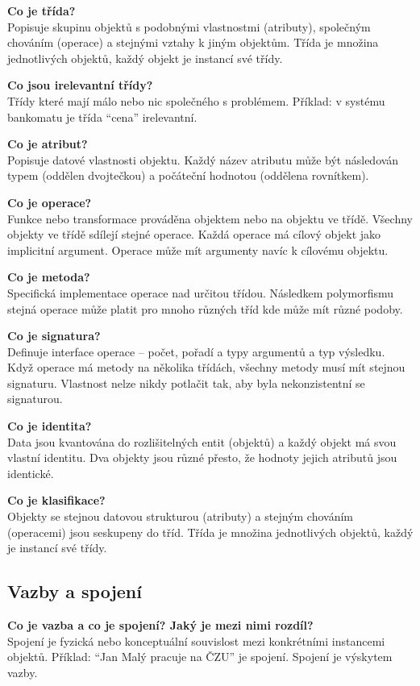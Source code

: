 \documentclass[12pt, a4paper]{article}
\begin{document}
\textbf{Co je třída?}\\
Popisuje skupinu objektů s podobnými vlastnostmi (atributy), společným chováním (operace) a stejnými vztahy k jiným objektům. Třída je množina jednotlivých objektů, každý objekt je instancí své třídy.

\textbf{Co jsou irelevantní třídy?}\\
Třídy které mají málo nebo nic společného s problémem. Příklad: v systému bankomatu je třída ``cena'' irelevantní.

\textbf{Co je atribut?}\\
Popisuje datové vlastnosti objektu. Každý název atributu může být následován typem (oddělen dvojtečkou) a počáteční hodnotou (oddělena rovnítkem).

\textbf{Co je operace?}\\
Funkce nebo transformace prováděna objektem nebo na objektu ve třídě. Všechny objekty ve třídě sdílejí stejné operace. Každá operace má cílový objekt jako implicitní argument. Operace může mít argumenty navíc k cílovému objektu.

\textbf{Co je metoda?}\\
Specifická implementace operace nad určitou třídou. Následkem polymorfismu stejná operace může platit pro mnoho různých tříd kde může mít různé podoby.

\textbf{Co je signatura?}\\
Definuje interface operace -- počet, pořadí a typy argumentů a typ výsledku. Když operace má metody na několika třídách, všechny metody musí mít stejnou signaturu. Vlastnost nelze nikdy potlačit tak, aby byla nekonzistentní se signaturou.

\textbf{Co je identita?}\\
Data jsou kvantována do rozlišitelných entit (objektů) a každý objekt má svou vlastní identitu. Dva objekty jsou různé přesto, že hodnoty jejich atributů jsou identické.

\textbf{Co je klasifikace?}\\
Objekty se stejnou datovou strukturou (atributy) a stejným chováním (operacemi) jsou seskupeny do tříd. Třída je množina jednotlivých objektů, každý je instancí své třídy.

\subsection{Vazby a spojení}

\textbf{Co je vazba a co je spojení? Jaký je mezi nimi rozdíl?}\\
Spojení je fyzická nebo konceptuální souvislost mezi konkrétními instancemi objektů. Příklad: ``Jan Malý pracuje na ČZU'' je spojení. Spojení je výskytem vazby.
\end{document}

